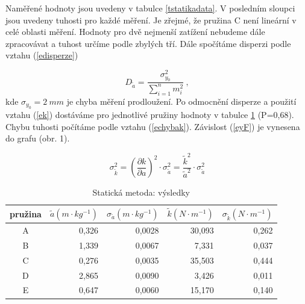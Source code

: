 \documentclass{article}
\begin{document}
Naměřené hodnoty jsou uvedeny v tabulce \ref{tstatikadata}. V posledním sloupci jsou uvedeny tuhosti pro každé měření. Je zřejmé, že pružina C není lineární v celé oblasti měření. Hodnoty pro dvě nejmenší zatížení nebudeme dále zpracovávat a tuhost určíme podle zbylých tří. Dále spočítáme disperzi podle vztahu (\ref{edisperze}) \cite{englich}


\begin{equation} \label{edisperze}
D_{\tilde{a}}=\frac{\sigma _{y_{0}}^{2}}{\sum_{i=1}^{n} m_{i}^{2}}~,
\end{equation}
kde $\sigma_{y_{0}} = 2~mm$ je chyba měření prodloužení. Po odmocnění disperze a použití vztahu (\ref{ek}) dostáváme pro jednotlivé pružiny hodnoty v tabulce \ref{ttuhosti} (P=0,68). Chybu tuhosti počítáme podle vztahu (\ref{echybak}). Závislost (\ref{eyF}) je vynesena do grafu (obr. 1).

\begin{equation} \label{echybak}
\sigma _{\tilde{k}}^{2}=   (\frac{\partial k}   {\partial a})^{2} \cdot \sigma _{\tilde{a}}^{2} = \frac{\tilde{k} ^{2}}{\tilde{a}^{2}} \cdot \sigma _{\tilde{a}}^{2}
\end{equation}

\begin{table}[htbp]
\begin{center}
\begin{tabular}{|c|r|r|r|r|}
\hline
pružina & 
\multicolumn{1}{c|}{$\tilde{a} (m \cdot kg^{-1})$} & 
\multicolumn{1}{c|}{$\sigma _{\tilde{a}} (m \cdot kg^{-1})$} & 
\multicolumn{1}{c|}{$\tilde{k} (N \cdot m^{-1})$} & 
\multicolumn{1}{c|}{$\sigma _{\tilde{k}} (N \cdot m^{-1})$} \\ \hline
A & 0,326 & 0,0028 & 30,093 & 0,262 \\ \hline
B & 1,339 & 0,0067 & 7,331 & 0,037 \\ \hline
C & 0,276 & 0,0035 & 35,503 & 0,444 \\ \hline
D & 2,865 & 0,0090 & 3,426 & 0,011 \\ \hline
E & 0,647 & 0,0060 & 15,170 & 0,140 \\ \hline
\end{tabular}
\caption{Statická metoda: výsledky}
\label{ttuhosti}
\end{center}
\end{table}
\end{document}
